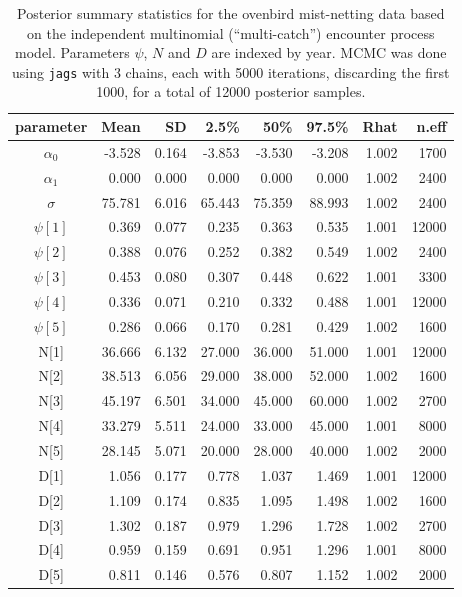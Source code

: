 \begin{table}[t!]
\centering
  \small
  \caption{Posterior summary statistics
for the ovenbird mist-netting data based on the
    independent multinomial (``multi-catch'') encounter process
    model. Parameters $\psi$, $N$ and $D$ are indexed by year.
MCMC was done using
    {\tt jags} with 3 chains, each with 5000 iterations, discarding
    the first 1000, for a total of 12000 posterior samples.}
  \begin{tabular}[t]{crrrrrrr}
    \hline \hline
parameter   &  Mean &  SD &  2.5\%  &  50\%  &  97.5\%  & Rhat &  n.eff \\
    \hline
$\alpha_0$ &  -3.528 &   0.164 & -3.853 &  -3.530 &  -3.208 &  1.002 &  1700 \\
$\alpha_1$ &  0.000 &  0.000 &  0.000 &  0.000 &  0.000 &  1.002 &  2400 \\
$\sigma$  &  75.781 &  6.016 &  65.443 &  75.359 &  88.993 &  1.002 &  2400 \\
$\psi[1]$ &  0.369 &  0.077 &  0.235 &  0.363 &   0.535 &  1.001 &  12000 \\
$\psi[2]$ &  0.388 &  0.076 &  0.252 &  0.382 &  0.549 &  1.002 &  2400 \\
$\psi[3]$ &  0.453 &  0.080 &  0.307 &  0.448 &  0.622 &  1.001 &  3300 \\
$\psi[4]$ &  0.336 &  0.071 &  0.210 &  0.332 &  0.488 &  1.001 &  12000 \\
$\psi[5]$ &  0.286 &  0.066 &  0.170 &  0.281 &  0.429 &  1.002  &  1600 \\
N[1] &   36.666 &  6.132 &  27.000 &  36.000 &  51.000 &  1.001 &  12000 \\
N[2] &   38.513 &  6.056 & 29.000  &  38.000 &  52.000 & 1.002 &  1600 \\
N[3] &   45.197 &  6.501 & 34.000 &  45.000  &  60.000 &  1.002 & 2700 \\
N[4] &   33.279 &  5.511 & 24.000 &  33.000  &  45.000 &  1.001 &  8000 \\
N[5] &   28.145 &  5.071 &  20.000 &  28.000 &  40.000 &  1.002 &  2000 \\
D[1] &   1.056  &  0.177 &  0.778 &  1.037 &  1.469 &  1.001 & 12000 \\
D[2] &    1.109 &  0.174 &  0.835 &  1.095 &  1.498 &  1.002 &  1600 \\
D[3] &    1.302 &  0.187 &  0.979 &  1.296 &  1.728 &  1.002 &  2700 \\
D[4] &    0.959 &  0.159 &  0.691 &  0.951 &  1.296 &  1.001 &  8000 \\
D[5] &    0.811 &  0.146 &  0.576 &  0.807 &  1.152 & 1.002  &  2000 \\
\hline
  \end{tabular}
  \label{scrovenbird.results}
\end {table}


